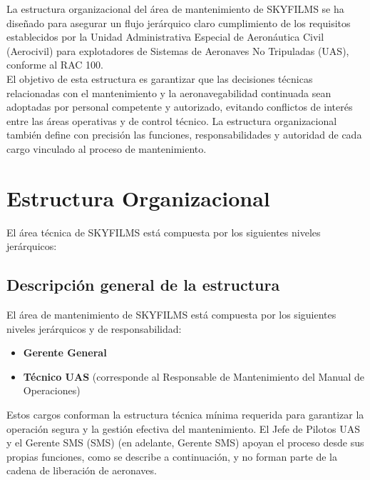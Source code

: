 La estructura organizacional del área de mantenimiento de SKYFILMS se ha diseñado para asegurar un flujo jerárquico claro cumplimiento de los requisitos establecidos por la Unidad Administrativa Especial de Aeronáutica Civil (Aerocivil) para explotadores de Sistemas de Aeronaves No Tripuladas (UAS), conforme al RAC 100.\\

El objetivo de esta estructura es garantizar que las decisiones técnicas relacionadas con el mantenimiento y la aeronavegabilidad continuada sean adoptadas por personal competente y autorizado, evitando conflictos de interés entre las áreas operativas y de control técnico.
La estructura organizacional también define con precisión las funciones, responsabilidades y autoridad de cada cargo vinculado al proceso de mantenimiento.

\section{Estructura Organizacional}
El área técnica de SKYFILMS está compuesta por los siguientes niveles jerárquicos:

\subsection{Descripción general de la estructura}
El área de mantenimiento de SKYFILMS está compuesta por los siguientes niveles jerárquicos y de responsabilidad:

\begin{itemize}

    \item \textbf{Gerente General}
    \item \textbf{Técnico UAS} (corresponde al Responsable de Mantenimiento del Manual de Operaciones)

\end{itemize}

Estos cargos conforman la estructura técnica mínima requerida para garantizar la operación segura y la gestión efectiva del mantenimiento. El Jefe de Pilotos UAS y el Gerente SMS (SMS) (en adelante, Gerente SMS) apoyan el proceso desde sus propias funciones, como se describe a continuación, y no forman parte de la cadena de liberación de aeronaves.

